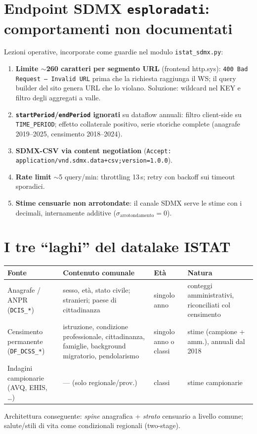 \documentclass[11pt,a4paper]{article}
\newcommand{\code}[1]{\texttt{#1}}
\newcommand{\flow}[1]{\texttt{\small #1}}
\begin{document}
\section{Endpoint SDMX \code{esploradati}: comportamenti non documentati}
\label{sec:quirks}
Lezioni operative, incorporate come guardie nel modulo \code{istat\_sdmx.py}:
\begin{enumerate}[leftmargin=*]
  \item \textbf{Limite $\sim$260 caratteri per segmento URL} (frontend http.sys):
  \code{400 Bad Request -- Invalid URL} prima che la richiesta raggiunga il WS;
  il query builder del sito genera URL che lo violano. Soluzione: wildcard nel
  KEY e filtro degli aggregati a valle.
  \item \textbf{\code{startPeriod}/\code{endPeriod} ignorati} su dataflow
  annuali: filtro client-side su \code{TIME\_PERIOD}; effetto collaterale
  positivo, serie storiche complete (anagrafe 2019--2025, censimento 2018--2024).
  \item \textbf{SDMX-CSV via content negotiation}
  (\code{Accept: application/vnd.sdmx.data+csv;version=1.0.0}).
  \item \textbf{Rate limit} $\sim$5 query/min: throttling 13\,s; retry con
  backoff sui timeout sporadici.
  \item \textbf{Stime censuarie non arrotondate}: il canale SDMX serve le stime
  con i decimali, internamente additive ($\sigma_{\text{arrotondamento}}=0$).
\end{enumerate}

\section{I tre ``laghi'' del datalake ISTAT}
\label{sec:laghi}
\begin{center}
\begin{tabular}{@{}p{3.1cm}p{4.6cm}p{2.6cm}p{3.6cm}@{}}
\toprule
\textbf{Fonte} & \textbf{Contenuto comunale} & \textbf{Et\`a} & \textbf{Natura}\\
\midrule
Anagrafe / ANPR (\flow{DCIS\_*}) & sesso, et\`a, stato civile; stranieri; paese di cittadinanza & singolo anno & conteggi amministrativi, riconciliati col censimento\\
\addlinespace
Censimento permanente (\flow{DF\_DCSS\_*}) & istruzione, condizione professionale, cittadinanza, famiglie, background migratorio, pendolarismo & singolo anno o classi & stime (campione + amm.), annuali dal 2018\\
\addlinespace
Indagini campionarie (AVQ, EHIS, \dots) & --- (solo regionale/prov.) & classi & stime campionarie\\
\bottomrule
\end{tabular}
\end{center}
\noindent Architettura conseguente: \emph{spine} anagrafica + \emph{strato}
censuario a livello comune; salute/stili di vita come condizionali regionali
(two-stage).
\end{document}
